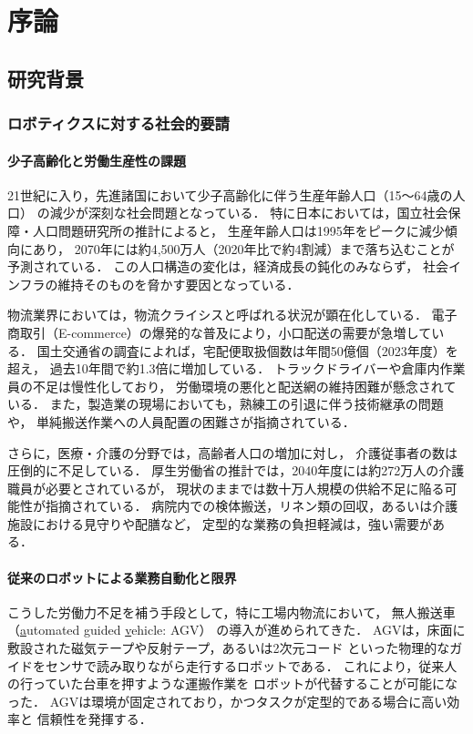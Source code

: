 \chapter{序論}\label{chap:introduction}

\section{研究背景}\label{sec:intro_bg}
\subsection{ロボティクスに対する社会的要請}

\subsubsection{少子高齢化と労働生産性の課題}
21世紀に入り，先進諸国において少子高齢化に伴う生産年齢人口（15〜64歳の人口）
の減少が深刻な社会問題となっている．
特に日本においては，国立社会保障・人口問題研究所の推計によると，
生産年齢人口は1995年をピークに減少傾向にあり，
2070年には約4,500万人（2020年比で約4割減）まで落ち込むことが予測されている\cite{jfpe2023}．
この人口構造の変化は，経済成長の鈍化のみならず，
社会インフラの維持そのものを脅かす要因となっている．

物流業界においては，物流クライシスと呼ばれる状況が顕在化している．
電子商取引（E-commerce）の爆発的な普及により，小口配送の需要が急増している．
国土交通省の調査によれば，宅配便取扱個数は年間50億個（2023年度）を超え，
過去10年間で約1.3倍に増加している\cite{sthd2024}．
トラックドライバーや倉庫内作業員の不足は慢性化しており，
労働環境の悪化と配送網の維持困難が懸念されている．
また，製造業の現場においても，熟練工の引退に伴う技術継承の問題や，
単純搬送作業への人員配置の困難さが指摘されている．

さらに，医療・介護の分野では，高齢者人口の増加に対し，
介護従事者の数は圧倒的に不足している．
厚生労働省の推計では，2040年度には約272万人の介護職員が必要とされているが，
現状のままでは数十万人規模の供給不足に陥る可能性が指摘されている\cite{nbnp2024}．
病院内での検体搬送，リネン類の回収，あるいは介護施設における見守りや配膳など，
定型的な業務の負担軽減は，強い需要がある．


\subsubsection{従来のロボットによる業務自動化と限界}
こうした労働力不足を補う手段として，特に工場内物流において，
無人搬送車（\underline{a}utomated \underline{g}uided \underline{v}ehicle: AGV）
の導入が進められてきた．
AGVは，床面に敷設された磁気テープや反射テープ，あるいは2次元コード
といった物理的なガイドをセンサで読み取りながら走行するロボットである．
これにより，従来人の行っていた台車を押すような運搬作業を
ロボットが代替することが可能になった．
AGVは環境が固定されており，かつタスクが定型的である場合に高い効率と
信頼性を発揮する．

